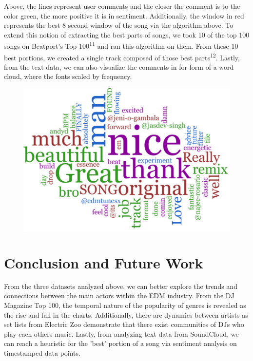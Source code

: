 \documentclass[12pt]{dalcsthesis}
\begin{document}
Above, the lines represent user comments and the closer the comment is to the color green, the more positive it is in sentiment. Additionally, the window in red represents the best 8 second window of the song via the algorithm above. To extend this notion of extracting the best parts of songs, we took 10 of the top 100 songs on Beatport's Top 100\textsuperscript{11} and ran this algorithm on them. From these 10 best portions, we created a single track composed of those best parts\textsuperscript{12}. Lastly, from the text data, we can also visualize the comments in for form of a word cloud, where the fonts scaled by frequency.

\begin{figure}[h]
\includegraphics[scale=.45]{word_cloud}
\centering
\end{figure}

\chapter{Conclusion and Future Work}

From the three datasets analyzed above, we can better explore the trends and connections between the main actors within the EDM industry. From the DJ Magazine Top 100, the temporal nature of the popularity of genres is revealed as the rise and fall in the charts. Additionally, there are dynamics between artists as set lists from Electric Zoo demonstrate that there exist communities of DJs who play each others music. Lastly, from analyzing text data from SoundCloud, we can reach a heuristic for the 'best' portion of a song via sentiment analysis on timestamped data points. \\
\end{document}
